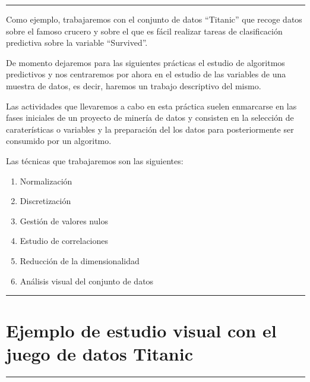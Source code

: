 \documentclass[]{article}
\providecommand{\tightlist}{%
  \setlength{\itemsep}{0pt}\setlength{\parskip}{0pt}}
\begin{document}
\begin{center}\rule{0.5\linewidth}{0.5pt}\end{center}

Como ejemplo, trabajaremos con el conjunto de datos ``Titanic'' que
recoge datos sobre el famoso crucero y sobre el que es fácil realizar
tareas de clasificación predictiva sobre la variable ``Survived''.

De momento dejaremos para las siguientes prácticas el estudio de
algoritmos predictivos y nos centraremos por ahora en el estudio de las
variables de una muestra de datos, es decir, haremos un trabajo
descriptivo del mismo.

Las actividades que llevaremos a cabo en esta práctica suelen enmarcarse
en las fases iniciales de un proyecto de minería de datos y consisten en
la selección de caraterísticas o variables y la preparación del los
datos para posteriormente ser consumido por un algoritmo.

Las técnicas que trabajaremos son las siguientes:

\begin{enumerate}
\def\labelenumi{\arabic{enumi}.}
\tightlist
\item
  Normalización\\
\item
  Discretización\\
\item
  Gestión de valores nulos\\
\item
  Estudio de correlaciones\\
\item
  Reducción de la dimensionalidad
\item
  Análisis visual del conjunto de datos
\end{enumerate}

\begin{center}\rule{0.5\linewidth}{0.5pt}\end{center}

\hypertarget{ejemplo-de-estudio-visual-con-el-juego-de-datos-titanic}{%
\section{Ejemplo de estudio visual con el juego de datos
Titanic}\label{ejemplo-de-estudio-visual-con-el-juego-de-datos-titanic}}

\begin{center}\rule{0.5\linewidth}{0.5pt}\end{center}
\end{document}
